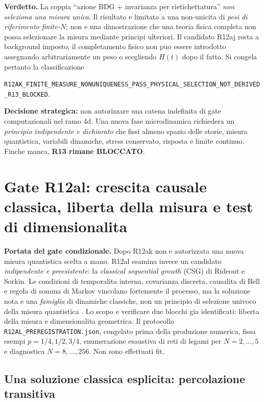 \documentclass[11pt,a4paper]{article}
\begin{document}
\textbf{Verdetto.} La coppia ``azione BDG + invarianza per rietichettatura'' \emph{non seleziona una misura unica}. Il risultato e limitato a una non-unicita di \emph{pesi di riferimento finite-$N$}; non e una dimostrazione che una teoria fisica completa non possa selezionare la misura mediante principi ulteriori. Il candidato R12aj resta a background imposto; il completamento fisico non puo essere introdotto assegnando arbitrariamente un peso o scegliendo $H(t)$ dopo il fatto. Si congela pertanto la classificazione
\begin{center}\small
\nolinkurl{R12AK_FINITE_MEASURE_NONUNIQUENESS_PASS_PHYSICAL_SELECTION_NOT_DERIVED_R13_BLOCKED}.
\end{center}
\textbf{Decisione strategica:} non autorizzare una catena indefinita di gate computazionali nel ramo 4d. Una nuova fase microdinamica richiedera un \emph{principio indipendente e dichiarato} che fissi almeno spazio delle storie, misura quantistica, variabili dinamiche, stress conservato, risposta e limite continuo. Finche manca, \textbf{R13 rimane BLOCCATO}.


\section{Gate R12al: crescita causale classica, liberta della misura e test di dimensionalita}
\label{sec:r12al}

\textbf{Portata del gate condizionale.} Dopo R12ak non e autorizzata una nuova misura quantistica scelta a mano. R12al esamina invece un candidato \emph{indipendente e preesistente}: la \emph{classical sequential growth} (CSG) di Rideout e Sorkin. Le condizioni di temporalita interna, covarianza discreta, causalita di Bell e regola di somma di Markov vincolano fortemente il processo, ma la soluzione nota e una \emph{famiglia} di dinamiche classiche, non un principio di selezione univoco della misura quantistica \cite{RideoutSorkin2000,VaradarajanRideout2006}. Lo scopo e verificare due blocchi gia identificati: liberta della misura e dimensionalita geometrica. Il protocollo \texttt{R12AL\_PREREGISTRATION.json}, congelato prima della produzione numerica, fissa esempi $p=1/4,1/2,3/4$, enumerazione esaustiva di reti di legami per $N=2,\ldots,5$ e diagnostica $N=8,\ldots,256$. Non sono effettuati fit.

\subsection{Una soluzione classica esplicita: percolazione transitiva}
\end{document}
